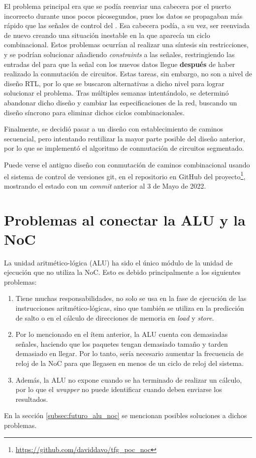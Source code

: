 El problema principal era que se podía reenviar una cabecera por el puerto incorrecto durante unos pocos picosegundos, pues los datos se propagaban más rápido que las señales de control del . Esa cabecera podía, a su vez, ser reenviada de nuevo creando una situación inestable en la que aparecía un ciclo combinacional. Estos problemas ocurrían al realizar una síntesis sin restricciones, y se podrían solucionar añadiendo \textit{constraints} a las señales, restringiendo las entradas del  para que la señal con los nuevos datos llegue \textbf{después} de haber realizado la conmutación de circuitos. Estas tareas, sin embargo, no son a nivel de diseño RTL, por lo que se buscaron alternativas a dicho nivel para lograr solucionar el problema. Tras múltiples semanas intentándolo, se determinó abandonar dicho diseño y cambiar las especificaciones de la red, buscando un diseño síncrono para eliminar dichos ciclos combinacionales.

Finalmente, se decidió pasar a un diseño con establecimiento de caminos secuencial, pero intentando reutilizar la mayor parte posible del diseño anterior, por lo que se implementó el algoritmo de conmutación de circuitos segmentado.

Puede verse el antiguo diseño con conmutación de caminos combinacional usando el sistema de control de versiones git, en el repositorio en GitHub del proyecto\footnote{\url{https://github.com/daviddavo/tfg_poc_noc}}, mostrando el estado con un \textit{commit} anterior al 3 de Mayo de 2022.

\section{Problemas al conectar la ALU y la NoC}
\label{sec:problemas_noc}

La unidad aritmético-lógica (ALU) ha sido el único módulo de la unidad de ejecución que no utiliza la NoC. Esto es debido principalmente a los siguientes problemas:

\begin{enumerate}
    \item Tiene muchas responsabilidades, no solo se usa en la fase de ejecución de las instrucciones aritmético-lógicas, sino que también se utiliza en la predicción de salto o en el cálculo de direcciones de memoria en \textit{load} y \textit{store}.
    \item Por lo mencionado en el ítem anterior, la ALU cuenta con demasiadas señales, haciendo que los paquetes tengan demasiado tamaño y tarden demasiado en llegar. 
    Por lo tanto, sería necesario aumentar la frecuencia de reloj de la NoC para que llegasen en menos de un ciclo de reloj del sistema.
    \item Además, la ALU no expone cuando se ha terminado de realizar un cálculo, por lo que el \textit{wrapper} no puede identificar cuando deben enviarse los resultados.
\end{enumerate}

En la sección \ref{subsec:futuro_alu_noc} se mencionan posibles soluciones a dichos problemas.